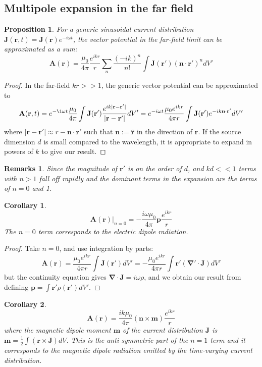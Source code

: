 \documentclass[a4paper]{article}
\newtheorem{remarks}{Remarks}[section]
\theoremstyle{new}
\newtheorem{prop}{Proposition}[section]
\newtheorem{cor}{Corollary}[section]
\begin{document}
\subsection{Multipole expansion in the far field}
\begin{prop}
For a generic sinusoidal current distribution $\mathbf{J}(\mathbf{r},t)=\mathbf{J}(\mathbf{r})e^{-i\omega t}$, the vector potential in the far-field limit can be approximated as a sum:
$$\mathbf{A}(\mathbf{r})=\frac{\mu_0}{4\pi}\frac{e^{ikr}}{r}\sum_n\frac{(-ik)^n}{n!}\int\mathbf{J}(\mathbf{r'})(\mathbf{n}\cdot\mathbf{r'})^ndV'$$
\end{prop}
\begin{proof}
In the far-field $kr>>1$, the generic vector potential can be approximated to 
$$\mathbf{A}(\mathbf{r},t)=e^{-\i\omega t}\frac{\mu_0}{4\pi}\int\mathbf{J}(\mathbf{r'})\frac{e^{ik|\mathbf{r}-\mathbf{r'}|}}{|\mathbf{r}-\mathbf{r'}|}dV'=e^{-i\omega t}\frac{\mu_0e^{ikr}}{4\pi r}\int\mathbf{J}(\mathbf{r'})e^{-ik\mathbf{n}\cdot\mathbf{r'}}dV'$$
where $|\mathbf{r}-\mathbf{r'}|\approx r-\mathbf{n}\cdot\mathbf{r'}$ such that $\mathbf{n}:=\mathbf{\hat{r}}$ in the direction of $\mathbf{r}$. If the source dimension $d$ is small compared to the wavelength, it is appropriate to expand in powers of $k$ to give our result.
\end{proof}
\begin{remarks}
Since the magnitude of $\mathbf{r'}$ is on the order of $d$, and $kd<<1$ terms with $n>1$ fall off rapidly and the dominant terms in the expansion are the terms of $n=0$ and 1.
\end{remarks}
\begin{cor}
$$\mathbf{A}(\mathbf{r})|_{n=0}=-\frac{i\omega\mu_0}{4\pi}\mathbf{p}\frac{e^{ikr}}{r}$$
The $n=0$ term corresponds to the electric dipole radiation.
\end{cor}
\begin{proof}
Take $n=0$, and use integration by parts:
$$\mathbf{A}(\mathbf{r})=\frac{\mu_0e^{ikr}}{4\pi r}\int\mathbf{J}(\mathbf{r'})dV'=-\frac{\mu_0e^{ikr}}{4\pi r}\int\mathbf{r'}(\boldsymbol{\nabla'}\cdot\mathbf{J})dV'$$
but the continuity equation gives $\boldsymbol{\nabla}\cdot\mathbf{J}=i\omega\rho$, and we obtain our result from defining $\mathbf{p}=\int\mathbf{r'}\rho(\mathbf{r'})dV'$.
\end{proof}
\begin{cor}
$$\mathbf{A}(\mathbf{r})=\frac{ik\mu_0}{4\pi}(\mathbf{n}\times\mathbf{m})\frac{e^{ikr}}{r}$$
where the magnetic dipole moment $\mathbf{m}$ of the current distribution $\mathbf{J}$ is $\mathbf{m}=\frac{1}{2}\int(\mathbf{r}\times\mathbf{J})dV$. This is the anti-symmetric part of the $n=1$ term and it corresponds to the magnetic dipole radiation emitted by the time-varying current distribution.
\end{cor}
\end{document}
